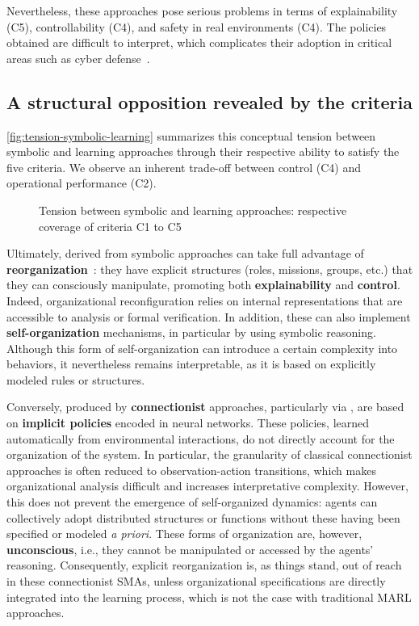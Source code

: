 Nevertheless, these approaches pose serious problems in terms of explainability (C5), controllability (C4), and safety in real environments (C4). The policies obtained are difficult to interpret, which complicates their adoption in critical areas such as cyber defense~\cite{Gunning2019}.

\subsection{A structural opposition revealed by the criteria}

\autoref{fig:tension-symbolic-learning} summarizes this conceptual tension between symbolic and learning approaches through their respective ability to satisfy the five criteria. We observe an inherent trade-off between control (C4) and operational performance (C2).

\begin{figure}[h!]
  \centering
  \resizebox{\textwidth}{!}{%
    
  }
  \caption{Tension between symbolic and learning approaches: respective coverage of criteria C1 to C5}
  \label{fig:tension-symbolic-learning}
\end{figure}

Ultimately,  derived from symbolic approaches can take full advantage of \textbf{reorganization}~: they have explicit structures (roles, missions, groups, etc.) that they can consciously manipulate, promoting both \textbf{explainability} and \textbf {control}. Indeed, organizational reconfiguration relies on internal representations that are accessible to analysis or formal verification. In addition, these  can also implement \textbf{self-organization} mechanisms, in particular by using symbolic reasoning. Although this form of self-organization can introduce a certain complexity into behaviors, it nevertheless remains interpretable, as it is based on explicitly modeled rules or structures.

Conversely,  produced by \textbf{connectionist} approaches, particularly via , are based on \textbf{implicit policies} encoded in neural networks. These policies, learned automatically from environmental interactions, do not directly account for the organization of the system. In particular, the granularity of classical connectionist approaches is often reduced to observation-action transitions, which makes organizational analysis difficult and increases interpretative complexity. However, this does not prevent the emergence of self-organized dynamics: agents can collectively adopt distributed structures or functions without these having been specified or modeled \textit{a priori}. These forms of organization are, however, \textbf{unconscious}, i.e., they cannot be manipulated or accessed by the agents' reasoning. Consequently, explicit reorganization is, as things stand, out of reach in these connectionist SMAs, unless organizational specifications are directly integrated into the learning process, which is not the case with traditional MARL approaches.


